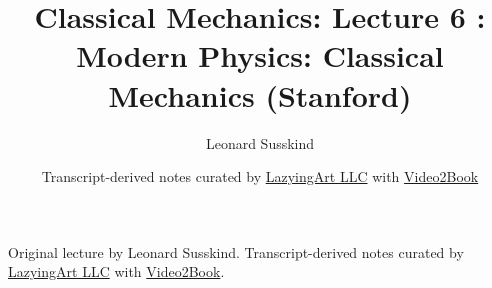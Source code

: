 \documentclass[11pt,oneside]{book}
\begin{document}
\frontmatter
\title{Classical Mechanics: Lecture 6 : Modern Physics: Classical Mechanics (Stanford)}
\author{Leonard Susskind}
\date{Transcript-derived notes curated by \href{https://lazying.art}{LazyingArt LLC} with \href{https://github.com/lachlanchen/Video2Book}{Video2Book}}
\maketitle
\begin{center}
\small Original lecture by Leonard Susskind. Transcript-derived notes curated by \href{https://lazying.art}{LazyingArt LLC} with \href{https://github.com/lachlanchen/Video2Book}{Video2Book}.
\end{center}
\clearpage
\mainmatter

\end{document}
